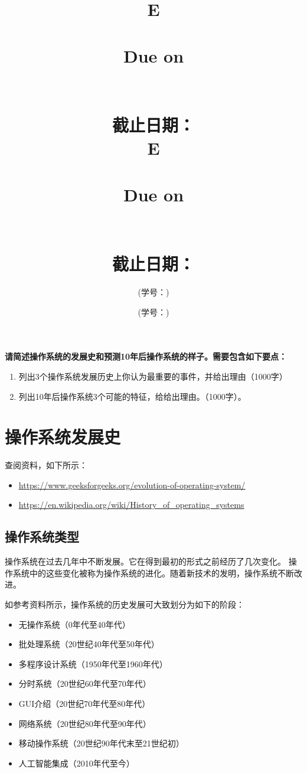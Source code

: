 \documentclass[UTF8]{homework.cls}
\date{} %
\title{
        \vspace{3in}
        \if\hmwkLanguage E
            \huge{\textbf{\hmwkClass}}\\
            \vspace{0.4in}
            \huge{\textbf{\hmwkTitle}}\\
            \vspace{0.4in}
            \normalsize{Due on \hmwkDueDate}\\
        \else
            \Huge{\textbf{\hmwkClassCN}}\\
            \vspace{0.3in}
            \Huge{\textbf{\hmwkTitleCN}}\\
            \vspace{0.4in}
            \normalsize{截止日期：\hmwkDueDateCN}\\
        \fi
        \vspace{2.4in}
    }
\author{\hmwkAuthorName}
\author{\hmwkAuthorNameCN (学号：\hmwkAuthorIDCN)}
\date{}
\title{
        \if\hmwkLanguage E
            \huge{\textbf{\hmwkClass}}\\
            \vspace{0.05in}
            \huge{\textbf{\hmwkTitle}}\\
            \vspace{0.2in}
            \normalsize{Due on \hmwkDueDate}\\
        \else
            \Huge{\textbf{\hmwkClassCN}}\\
            \vspace{0.05in}
            \Huge{\textbf{\hmwkTitleCN}}\\
            \vspace{0.2in}
            \normalsize{截止日期：\hmwkDueDateCN}\\
        \fi
    }
\author{\hmwkAuthorName}
\author{\hmwkAuthorNameCN (学号：\hmwkAuthorIDCN)}
\date{}
\begin{document}
\maketitle
\if{}
    \pagebreak
\fi


%
%
\begin{homeworkProblem}
\textbf{    请简述操作系统的发展史和预测10年后操作系统的样子。需要包含如下要点：}
    \begin{enumerate}
    	\item 列出3个操作系统发展历史上你认为最重要的事件，并给出理由（1000字）
    	\item 列出10年后操作系统3个可能的特征，给给出理由。（1000字）。
    \end{enumerate}
    
\solution

\section{操作系统发展史}

查阅资料，如下所示：

\begin{itemize}
    \item \href{https://www.geeksforgeeks.org/evolution-of-operating-system/}{\underline{https://www.geeksforgeeks.org/evolution-of-operating-system/}}
    \item \href{https://en.wikipedia.org/wiki/History\_of\_operating\_systems}{\underline{https://en.wikipedia.org/wiki/History\_of\_operating\_systems}}
\end{itemize}

\subsection{操作系统类型}

操作系统在过去几年中不断发展。它在得到最初的形式之前经历了几次变化。
操作系统中的这些变化被称为操作系统的进化。随着新技术的发明，操作系统不断改进。

如参考资料所示，操作系统的历史发展可大致划分为如下的阶段：

\begin{itemize}
    \item 无操作系统（0年代至40年代）
    \item 批处理系统（20世纪40年代至50年代）
    \item 多程序设计系统（1950年代至1960年代）
    \item 分时系统（20世纪60年代至70年代）
    \item GUI介绍（20世纪70年代至80年代）
    \item 网络系统（20世纪80年代至90年代）
    \item 移动操作系统（20世纪90年代末至21世纪初）
    \item 人工智能集成（2010年代至今）
\end{itemize}


\end{homeworkProblem}
\end{document}
